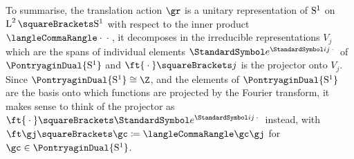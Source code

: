 \documentclass[10pt, a4paper, twoside]{lecturenotes}
\begin{document}
\begin{supplemental}
\begin{equation*}
\end{equation*}
To summarise, the translation action $\gr$ is a unitary representation of $\mathrm{S}^{1}$ on $\Lspace[2]\of{\UnitSphere 1}$ with respect to the inner product $\LTwoInner \placeholder\placeholder$, it decomposes in the irreducible representations $V_j$ which are the spans of individual elements $\E^{\I j \placeholder}$ of $\PontryaginDual{\UnitSphere 1}$ and $\ft{\placeholder}\of{j}$ is the projector onto $V_j$. Since $\PontryaginDual {\UnitSphere 1} \Isomorphic \Z$, and the elements of $\PontryaginDual {\UnitSphere 1}$ are the basis onto which functions are projected by the Fourier transform, it makes sense to think of the projector as $\ft{\placeholder}\of{\E^{\I j \placeholder}}$ instead, with $\ft\gj\of{\gc}\DefineAs\LTwoInner\gc\gj$ for $\gc\in\PontryaginDual {\UnitSphere 1}$.
 

\end{supplemental}
\end{document}
